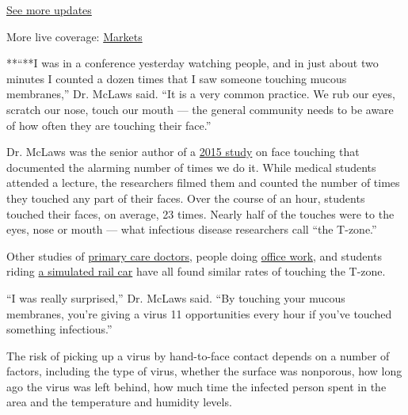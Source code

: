 \href{https://www.nytimes3xbfgragh.onion/2020/08/21/world/covid-19-coronavirus.html?action=click\&pgtype=Article\&state=default\&region=MAIN_CONTENT_1\&context=storylines_live_updates}{See
more updates}

More live coverage:
\href{https://www.nytimes3xbfgragh.onion/live/2020/08/20/business/stock-market-today-coronavirus?action=click\&pgtype=Article\&state=default\&region=MAIN_CONTENT_1\&context=storylines_live_updates}{Markets}

**``**I was in a conference yesterday watching people, and in just about
two minutes I counted a dozen times that I saw someone touching mucous
membranes,'' Dr. McLaws said. ``It is a very common practice. We rub our
eyes, scratch our nose, touch our mouth --- the general community needs
to be aware of how often they are touching their face.''

Dr. McLaws was the senior author of a
\href{https://www.ncbi.nlm.nih.gov/pubmed/25637115}{2015 study} on face
touching that documented the alarming number of times we do it. While
medical students attended a lecture, the researchers filmed them and
counted the number of times they touched any part of their faces. Over
the course of an hour, students touched their faces, on average, 23
times. Nearly half of the touches were to the eyes, nose or mouth ---
what infectious disease researchers call ``the T-zone.''

Other studies of
\href{https://www.jabfm.org/content/27/3/339/tab-article-info}{primary
care doctors}, people doing
\href{https://www.tandfonline.com/doi/full/10.1080/15459620802003896}{office
work}, and students riding
\href{https://search.proquest.com/openview/e2c136dc5c05115cdf9e55cb5133bc46/1?cbl=2040555\&pq-origsite=gscholar}{a
simulated rail car} have all found similar rates of touching the T-zone.

``I was really surprised,'' Dr. McLaws said. ``By touching your mucous
membranes, you're giving a virus 11 opportunities every hour if you've
touched something infectious.''

The risk of picking up a virus by hand-to-face contact depends on a
number of factors, including the type of virus, whether the surface was
nonporous, how long ago the virus was left behind, how much time the
infected person spent in the area and the temperature and humidity
levels.

